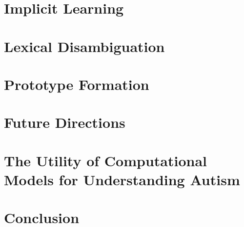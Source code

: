 \documentclass[man]{apa}
\begin{document}
% 
% 


\section{Implicit Learning}
\label{section:implicit}




\section{Lexical Disambiguation}
\label{section:lexical}




\section{Prototype Formation}
\label{section:prototype}




\section{Future Directions}
\label{section:future}




\section{The Utility of Computational Models for Understanding Autism}
\label{section:modeling}




\section{Conclusion}
\label{section:conclusion}





\end{document}
